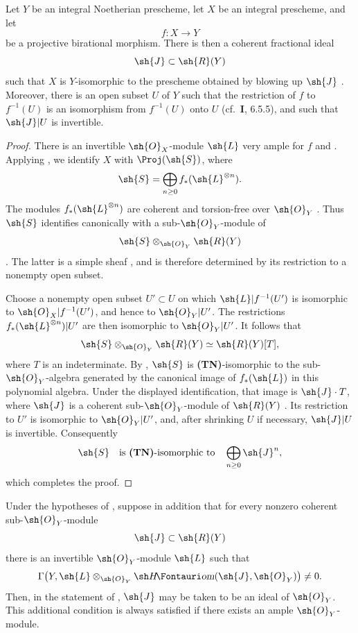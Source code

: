 \begin{proposition}[2.3.5]
\label{III.2.3.5}
Let $Y$ be an integral Noetherian prescheme, let $X$ be an integral prescheme, and let
\[
  f:X\longrightarrow Y
\]
be a projective birational morphism.
There is then a coherent fractional ideal
\[
  \sh{J}\subset\sh{R}(Y)
\]
 such that $X$ is $Y$-isomorphic to the prescheme obtained by blowing up $\sh{J}$ .
Moreover, there is an open subset $U$ of $Y$ such that the restriction of $f$ to $f^{-1}(U)$ is an isomorphism from $f^{-1}(U)$ onto $U$ (cf.\ \textbf{I}, 6.5.5), and such that $\sh{J}|U$ is invertible.
\end{proposition}

\begin{proof}
There is an invertible $\sh{O}_X$-module $\sh{L}$ very ample for $f$  and .
Applying , we identify $X$ with $\Proj(\sh{S})$, where
\[
  \sh{S}=\bigoplus_{n\geq0}f_*(\sh{L}^{\otimes n}).
\]
The modules $f_*(\sh{L}^{\otimes n})$ are coherent and torsion-free over $\sh{O}_Y$ .
Thus $\sh{S}$ identifies canonically with a sub-$\sh{O}_Y$-module of
\[
  \sh{S}\otimes_{\sh{O}_Y}\sh{R}(Y)
\]
.
The latter is a simple sheaf , and is therefore determined by its restriction to a nonempty open subset.

Choose a nonempty open subset $U'\subset U$ on which $\sh{L}|f^{-1}(U')$ is isomorphic to $\sh{O}_X|f^{-1}(U')$, and hence to $\sh{O}_Y|U'$.
The restrictions $f_*(\sh{L}^{\otimes n})|U'$ are then isomorphic to $\sh{O}_Y|U'$.
It follows that
\[
  \sh{S}\otimes_{\sh{O}_Y}\sh{R}(Y)
  \simeq\sh{R}(Y)[T],
\]
where $T$ is an indeterminate.
By , $\sh{S}$ is \textbf{(TN)}-isomorphic to the sub-$\sh{O}_Y$-algebra generated by the canonical image of $f_*(\sh{L})$ in this polynomial algebra.
Under the displayed identification, that image is $\sh{J}\cdot T$, where $\sh{J}$ is a coherent sub-$\sh{O}_Y$-module of $\sh{R}(Y)$ .
Its restriction to $U'$ is isomorphic to $\sh{O}_Y|U'$, and, after shrinking $U$ if necessary, $\sh{J}|U$ is invertible.
Consequently
\[
  \sh{S}\quad\text{is \textbf{(TN)}-isomorphic to}\quad
  \bigoplus_{n\geq0}\sh{J}^n,
\]
which completes the proof.
\end{proof}

\begin{corollary}[2.3.6]
\label{III.2.3.6}
Under the hypotheses of , suppose in addition that for every nonzero coherent sub-$\sh{O}_Y$-module
\[
  \sh{J}\subset\sh{R}(Y)
\]
there is an invertible $\sh{O}_Y$-module $\sh{L}$ such that
\[
  \Gamma\bigl(Y,\sh{L}\otimes_{\sh{O}_Y}
  \shHom(\sh{J},\sh{O}_Y)\bigr)\neq0.
\]
Then, in the statement of , $\sh{J}$ may be taken to be an ideal of $\sh{O}_Y$.
This additional condition is always satisfied if there exists an ample $\sh{O}_Y$-module.
\end{corollary}

